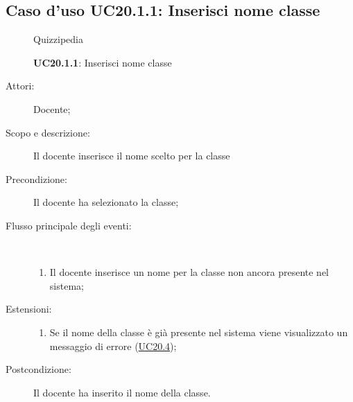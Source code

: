 \subsection{Caso d'uso UC20.1.1: Inserisci nome classe}
\begin{figure}[H]
	\centering
	\begin{resizedtikzpicture}{\textwidth}
		\begin{umlsystem}[x=0, fill=lightgray!20]{Quizzipedia}
		\end{umlsystem}
	\end{resizedtikzpicture}
	\caption{\textbf{UC20.1.1}: Inserisci nome classe}
	\label{UC20.1.1}
\end{figure}
\begin{description}
	\item[Attori:] Docente;
	\item[Scopo e descrizione:] Il docente inserisce il nome scelto per la classe
	\item[Precondizione:] Il docente ha selezionato la classe;
	
	\item[Flusso principale degli eventi:] \ 
	\begin{enumerate}
		\item Il docente inserisce un nome per la classe non ancora presente nel sistema;
		
	\end{enumerate}
	\item[Estensioni:]
	\begin{enumerate}
		\item Se il nome della classe è già presente nel sistema viene visualizzato un messaggio di errore (\hyperlink{UC20.4}{UC20.4});
		
	\end{enumerate}
	\item[Postcondizione:] Il docente ha inserito il nome della classe.
\end{description}
\hypertarget{UC20.1.2}{}

